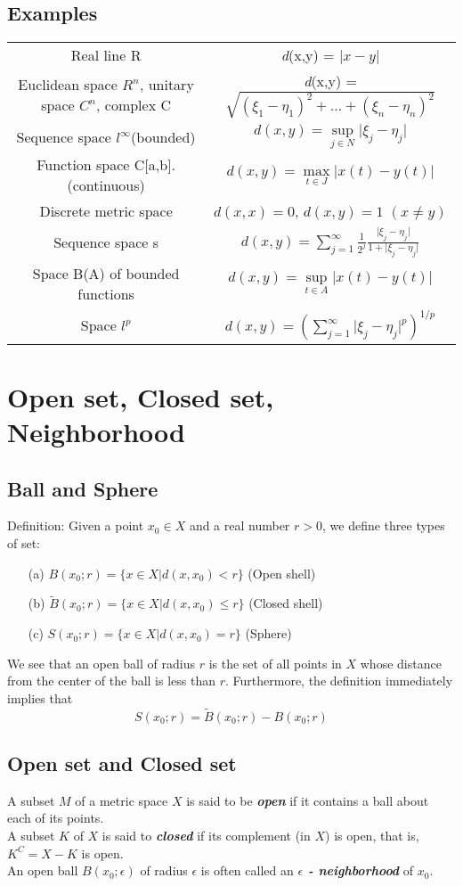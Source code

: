 \documentclass[12pt,letterpaper]{article}
\begin{document}
\subsection{Examples}
\begin{tabular}{cc}
Real line R & \textit{d}(x,y) = $\lvert x - y \rvert$ \\
Euclidean space $R^n$, unitary space $C^n$, complex C & \textit{d}(x,y) = $\sqrt{
    (\xi_1 - \eta_1)^2 + \dots + (\xi_n-\eta_n)^2
    }$\\
Sequence space $l^{\infty}$(bounded) & $\textit{d}(x,y)=\sup\limits_{j \in N} \lvert
\xi_j - \eta_j \rvert$\\
Function space C[a,b].(continuous) & $\textit{d}(x,y)=\max\limits_{t \in J}\lvert
x(t)-y(t)\rvert$ \\
Discrete metric space & $d(x,x)=0$,  $d(x,y)=1$  $(x\neq y)$\\
Sequence space s & $
d(x,y) = \sum\limits_{j=1}^{\infty} \frac{1}{2^j} \frac{\lvert \xi_j - \eta_j
\rvert}{1+\lvert \xi_j - \eta_j \rvert}
$\\
Space B(A) of bounded functions & $d(x,y)=\sup\limits_{t\in A}
\lvert x(t)-y(t)\rvert$ \\
Space $l^p$ & $d(x,y)=(\sum\limits_{j=1}^{\infty}{\lvert \xi_j - \eta_j \rvert}
^p)^{1/p}$ 
\end{tabular}

\section{Open set, Closed set, Neighborhood}
\subsection{Ball and Sphere}
Definition: Given a point $x_0 \in X$ and a real number $r > 0$, we define
three types of set:
\begin{enumerate}
\item[(a)] $B(x_0;r) = \{x\in X \vert d(x,x_0) < r\}$  (Open shell) 
\item[(b)] $\widetilde{B}(x_0;r) = \{x\in X \vert d(x,x_0) \leq r\}$  (Closed shell)
\item[(c)] $S(x_0;r) = \{x\in X \vert d(x,x_0) = r\}$  (Sphere)
\end{enumerate}
We see that an open ball of radius $r$ is the set of all points in $X$ whose
distance from the center of the ball is less than $r$. Furthermore, the definition immediately
implies that
$$ S(x_0;r)=\widetilde{B}(x_0;r)-B(x_0;r)$$

\subsection{Open set and Closed set}
A subset $M$ of a metric space $X$ is said to be \textit{\textbf{open}} if it contains a ball
about each of its points.\\
A subset $K$ of $X$ is said to \textit{\textbf{closed}} if its complement (in $X$) is
open, that is, $K^C =X-K$ is open.\\
An open ball $B(x_0;\epsilon)$ of radius $\epsilon$ is often called an 
\textit{\textbf{$\epsilon$ - neighborhood}} of $x_0$.\\
\end{document}
